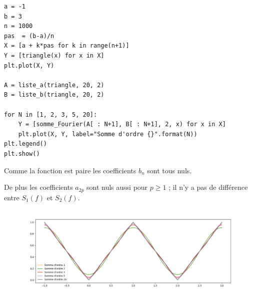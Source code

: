 \begin{Answer}
\begin{lstlisting}
a = -1
b = 3
n = 1000
pas  = (b-a)/n
X = [a + k*pas for k in range(n+1)]
Y = [triangle(x) for x in X]
plt.plot(X, Y)

A = liste_a(triangle, 20, 2)
B = liste_b(triangle, 20, 2)

for N in [1, 2, 3, 5, 20]:
    Y = [somme_Fourier(A[ : N+1], B[ : N+1], 2, x) for x in X]
    plt.plot(X, Y, label="Somme d'ordre {}".format(N))
plt.legend()
plt.show()
\end{lstlisting}
Comme la fonction est paire les coefficients $b_n$ sont tous nuls.

De plus les coefficients $a_{2p}$ sont nuls aussi pour $p\ge 1$ ; il n'y a pas de différence entre $S_1(f)$ et $S_2(f)$.
\begin{center}
\includegraphics[scale=0.4]{TP/Images/TP19_triangle_Sn.png}
\end{center}
\end{Answer}
